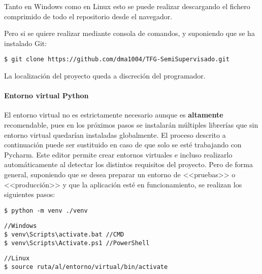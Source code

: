 Tanto en Windows como en Linux esto se puede realizar descargando el fichero
comprimido de todo el repositorio desde el navegador.

Pero si se quiere realizar mediante consola de comandos, y suponiendo que se ha
instalado Git:

\begin{tcolorbox}[colback=cyan!5!white,colframe=cyan!75!black,fontupper=\footnotesize,title=Clonación de repositorio desde consola]
\begin{verbatim}
$ git clone https://github.com/dma1004/TFG-SemiSupervisado.git
\end{verbatim}
\end{tcolorbox}
La localización del proyecto queda a discreción del programador.
\paragraph{Entorno virtual Python} El entorno virtual no es estrictamente
necesario aunque es \textbf{altamente} recomendable, pues en los próximos pasos
se instalarán múltiples librerías que sin entorno virtual quedarían instaladas
globalmente. El proceso descrito a continuación puede ser sustituido en caso de
que solo se esté trabajando con Pycharm. Este editor permite crear entornos
virtuales e incluso realizarlo automáticamente al detectar los distintos
requisitos del proyecto. Pero de forma general, suponiendo que se desea preparar
un entorno de <<pruebas>> o <<producción>> y que la aplicación esté en
funcionamiento, se realizan los siguientes pasos:
\begin{tcolorbox}[colback=cyan!5!white,colframe=orange!75!black,title=Creación del entorno virtual (dentro de la carpeta deseado)]
\begin{verbatim}
$ python -m venv ./venv
\end{verbatim}
\end{tcolorbox}

\begin{tcolorbox}[colback=cyan!5!white,colframe=cyan!75!black,fontupper=\footnotesize,fontlower=\footnotesize,title=Activación del entorno virtual]
\begin{verbatim}
//Windows
$ venv\Scripts\activate.bat //CMD
$ venv\Scripts\Activate.ps1 //PowerShell
\end{verbatim}
\tcblower
\begin{verbatim}
//Linux
$ source ruta/al/entorno/virtual/bin/activate
\end{verbatim}
\end{tcolorbox}

